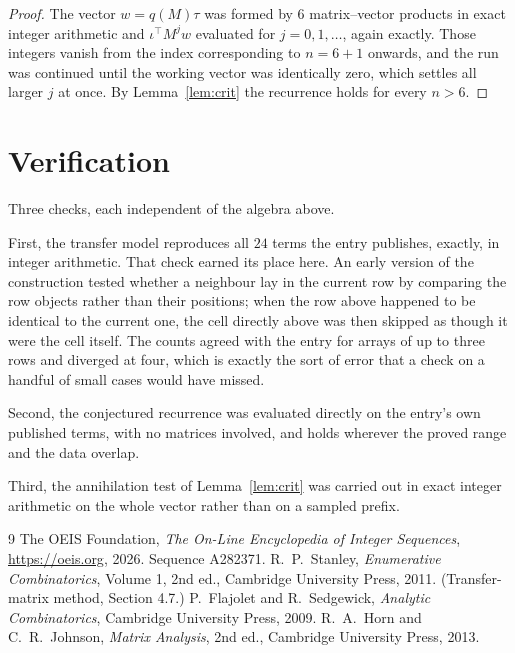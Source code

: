 \documentclass[11pt,a4paper]{article}
\theoremstyle{plain}
\theoremstyle{definition}
\begin{document}
\begin{proof}
The vector $w=q(M)\tau$ was formed by $6$ matrix--vector products in exact integer
arithmetic and $\iota^{\!\top}M^{j}w$ evaluated for $j=0,1,\dots$, again exactly. Those
integers vanish from the index corresponding to $n=6+1$ onwards, and the run was
continued until the working vector was identically zero, which settles all larger $j$ at once.
By Lemma~\ref{lem:crit} the recurrence holds for every $n>6$.
\end{proof}

\section{Verification}

Three checks, each independent of the algebra above.

First, the transfer model reproduces all $24$ terms the entry publishes, exactly, in
integer arithmetic. That check earned its place here. An early version of the construction
tested whether a neighbour lay in the current row by comparing the row objects rather
than their positions; when the row above happened to be identical to the current one, the
cell directly above was then skipped as though it were the cell itself. The counts agreed with
the entry for arrays of up to three rows and diverged at four, which is exactly the sort of
error that a check on a handful of small cases would have missed.

Second, the conjectured recurrence was evaluated directly on the entry's own published terms,
with no matrices involved, and holds wherever the proved range and the data overlap.

Third, the annihilation test of Lemma~\ref{lem:crit} was carried out in exact integer
arithmetic on the whole vector rather than on a sampled prefix.

\begin{thebibliography}{9}
 The OEIS Foundation, \emph{The On-Line Encyclopedia of Integer
Sequences}, \url{https://oeis.org}, 2026. Sequence A282371.
 R.~P.~Stanley, \emph{Enumerative Combinatorics}, Volume 1, 2nd ed.,
Cambridge University Press, 2011. (Transfer-matrix method, Section 4.7.)
 P.~Flajolet and R.~Sedgewick, \emph{Analytic Combinatorics}, Cambridge
University Press, 2009.
 R.~A.~Horn and C.~R.~Johnson, \emph{Matrix Analysis}, 2nd ed., Cambridge
University Press, 2013.
\end{thebibliography}
\end{document}
